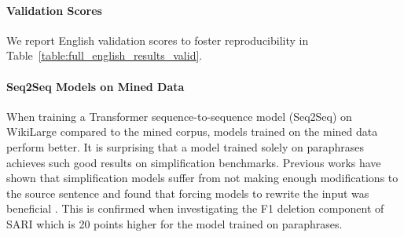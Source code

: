 \documentclass[11pt]{article}
\newcommand{\wikilarge}{WikiLarge\xspace}
\begin{document}
\paragraph{Validation Scores} We report English validation scores to foster reproducibility in Table~\ref{table:full_english_results_valid}.

\paragraph{Seq2Seq Models on Mined Data}
When training a Transformer sequence-to-sequence  model (Seq2Seq) on \wikilarge compared to the mined corpus, models trained on the mined data perform better. It is surprising that a model trained solely on paraphrases achieves such good results on simplification benchmarks.
Previous works have shown that simplification models suffer from not making enough modifications to the source sentence and found that forcing models to rewrite the input was beneficial \cite{wubben2012sentence,martin2020controllable}. This is confirmed when investigating the F1 deletion component of SARI which is 20 points higher for the model trained on paraphrases.
\end{document}
